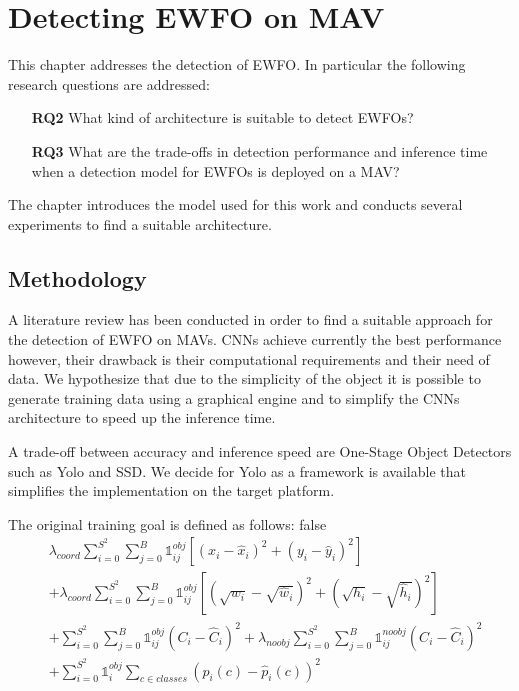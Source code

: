 	\chapter{Detecting \ac{EWFO} on \ac{MAV}}
	\label{sec:object_detection}
	
	This chapter addresses the detection of \ac{EWFO}. In particular the following research questions are addressed:
	
\begin{enumerate}
	\item[\textbf{RQ2}]What kind of architecture is suitable to detect \acp{EWFO}?
	\item[\textbf{RQ3}]What are the trade-offs in detection performance and inference time when a detection model for \acp{EWFO} is deployed on a \ac{MAV}?
\end{enumerate}

	The chapter introduces the model used for this work and conducts several experiments to find a suitable architecture.
	
	\section{Methodology}
	
	A literature review has been conducted in order to find a suitable approach for the detection of \ac{EWFO} on \acp{MAV}. \acp{CNN} achieve currently the best performance however, their drawback is their computational requirements and their need of data. We hypothesize that due to the simplicity of the object it is possible to generate training data using a graphical engine and to simplify the \acp{CNN} architecture to speed up the inference time.
	
	A trade-off between accuracy and inference speed are One-Stage Object Detectors such as \ac{Yolo} and \ac{SSD}. We decide for Yolo as a framework is available that simplifies the implementation on the target platform.
	
	The original training goal is defined as follows:
	\if false
	\begin{align}
	&\lambda_{coord} \sum_{i=0}^{S^2}\sum_{j=0}^B \mathbb{1}_{ij}^{obj}[(x_i-\hat{x}_i)^2 + (y_i-\hat{y}_i)^2 ] \\&+ \lambda_{coord} \sum_{i=0}^{S^2}\sum_{j=0}^B \mathbb{1}_{ij}^{obj}[(\sqrt{w_i}-\sqrt{\hat{w}_i})^2 +(\sqrt{h_i}-\sqrt{\hat{h}_i})^2 ]\\
	&+ \sum_{i=0}^{S^2}\sum_{j=0}^B \mathbb{1}_{ij}^{obj}(C_i - \hat{C}_i)^2 + \lambda_{noobj}\sum_{i=0}^{S^2}\sum_{j=0}^B \mathbb{1}_{ij}^{noobj}(C_i - \hat{C}_i)^2 \\
	&+ \sum_{i=0}^{S^2} \mathbb{1}_{i}^{obj}\sum_{c \in classes}(p_i(c) - \hat{p}_i(c))^2 \\
	\end{align}
	\fi
	
